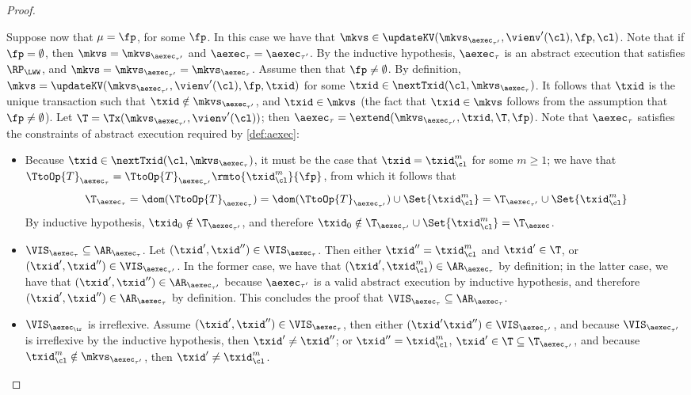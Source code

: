 \begin{proof}
\begin{itemize}
Suppose now that $\mu = \fp$, for some $\fp$. In this case we have that  
$\mkvs \in \updateKV(\mkvs_{\aexec_{\tau'}}, \vienv'(\cl), \fp, \cl)$. Note that if 
$\fp = \emptyset$, then $\mkvs = \mkvs_{\aexec_{\tau'}}$ and $\aexec_{\tau} = \aexec_{\tau'}$. 
By the inductive hypothesis, $\aexec_{\tau}$ is an abstract execution that satisfies 
$\RP_{\LWW}$, and $\mkvs = \mkvs_{\aexec_{\tau'}} = \mkvs_{\aexec_{\tau}}$. 
Assume then that $\fp \neq \emptyset$. By definition, $\mkvs = \updateKV(\mkvs_{\aexec_{\tau'}}, 
\vienv'(\cl), \fp, \txid)$ for some $\txid \in \nextTxid(\cl, \mkvs_{\aexec_{\tau}})$. It follows that $\txid$ 
is the unique transaction such that $\txid \notin \mkvs_{\aexec_{\tau'}}$, and $\txid \in \mkvs$ 
(the fact that $\txid \in \mkvs$ follows from the assumption that $\fp \neq \emptyset$). Let 
$\T = \Tx(\mkvs_{\aexec_{\tau'}}, \vienv'(\cl))$; then $\aexec_{\tau} = \extend(\mkvs_{\aexec_{\tau'}}, \txid, \T, \fp)$. 
Note that $\aexec_{\tau}$ satisfies the constraints of abstract execution required by \cref{def:aexec}:
\begin{itemize}
\item  Because $\txid \in \nextTxid(\cl, \mkvs_{\aexec_{\tau}})$, it must be the case that $\txid = \txid_{\cl}^{m}$ for some 
$m \geq 1$; we have that $\TtoOp{T}_{\aexec_{\tau}} = \TtoOp{T}_{\aexec_{\tau'}}\rmto{\txid_{\cl}^{m}}{\fp}$, 
from which it follows that 
\[
\T_{\aexec_{\tau}} = \dom(\TtoOp{T}_{\aexec_{\tau}}) = \dom(\TtoOp{T}_{\aexec_{\tau'}}) \cup 
\Set{\txid_{\cl}^{m} } = \T_{\aexec_{\tau'}} \cup \Set{\txid_{\cl}^{m} }
\]
By inductive hypothesis, $\txid_0 \notin \T_{\aexec_{\tau'}}$, and therefore $\txid_{0} \notin 
\T_{\aexec_{\tau'}} \cup \Set{\txid_{\cl}^{m} } = \T_{\aexec}$.

\item \( \VIS_{\aexec_{\tau}} \subseteq \AR_{\aexec_{\tau}} \).
    Let $(\txid' ,\txid'') \in \VIS_{\aexec_{\tau}}$. Then either $\txid'' = \txid_{\cl}^{m}$ and $\txid' \in \T$, or $(\txid', \txid'') \in 
\VIS_{\aexec_{\tau'}}$. In the former case, we have that $(\txid', \txid_{\cl}^{m}) \in \AR_{\aexec_{\tau}}$ by definition; 
in the latter case, we have that $(\txid', \txid'') \in \AR_{\aexec_{\tau'}}$ because $\aexec_{\tau'}$ is a valid 
abstract execution by inductive hypothesis, and therefore $(\txid', \txid'') \in \AR_{\aexec_{\tau}}$ by definition. 
This concludes the proof that $\VIS_{\aexec_{\tau}} \subseteq \AR_{\aexec_{\tau}}$. 
\item \( \VIS_{\aexec_\tr} \) is irreflexive.
Assume $(\txid', \txid'') \in \VIS_{\aexec_{\tau}}$, then either 
$(\txid' \txid'') \in \VIS_{\aexec_{\tau'}}$, and because $\VIS_{\aexec_{\tau'}}$ is irreflexive by the inductive hypothesis, 
then $\txid' \neq \txid''$; 
or $\txid'' = \txid_{\cl}^{m}$, $\txid' \in \T \subseteq \T_{\aexec_{\tau'}}$, 
and because $\txid_{\cl}^{m} \notin \mkvs_{\aexec_{\tau'}}$, then $\txid' \neq \txid_{\cl}^{m}$. 


\end{itemize}
\end{itemize}
\end{proof}
